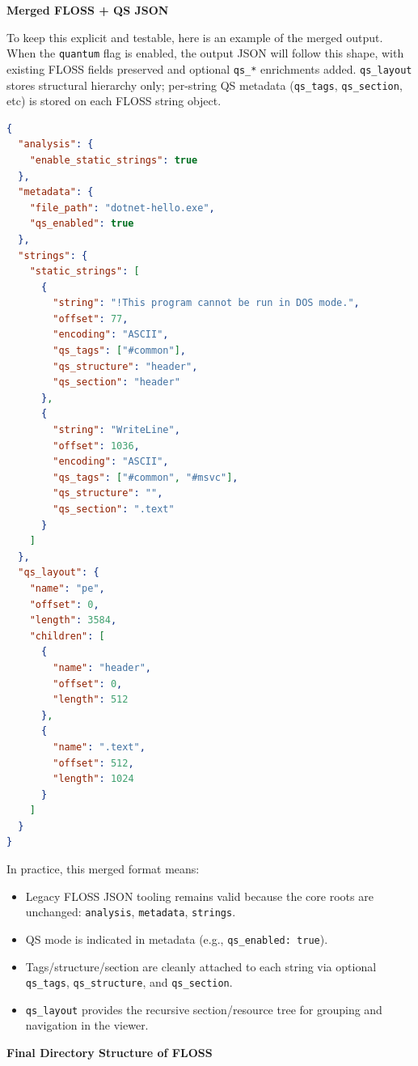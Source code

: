 \documentclass[12pt]{article}
\begin{document}
\textbf{Merged FLOSS + QS JSON}

To keep this explicit and testable, here is an example of the merged output. When the \texttt{quantum} flag is enabled, the output JSON will follow this shape, with existing FLOSS fields preserved and optional \texttt{qs\_*} enrichments added.
\texttt{qs\_layout} stores structural hierarchy only; per-string QS metadata (\texttt{qs\_tags}, \texttt{qs\_section}, etc) is stored on each FLOSS string object.

\begin{lstlisting}[language=json]
{
  "analysis": {
    "enable_static_strings": true
  },
  "metadata": {
    "file_path": "dotnet-hello.exe",
    "qs_enabled": true
  },
  "strings": {
    "static_strings": [
      {
        "string": "!This program cannot be run in DOS mode.",
        "offset": 77,
        "encoding": "ASCII",
        "qs_tags": ["#common"],
        "qs_structure": "header",
        "qs_section": "header"
      },
      {
        "string": "WriteLine",
        "offset": 1036,
        "encoding": "ASCII",
        "qs_tags": ["#common", "#msvc"],
        "qs_structure": "",
        "qs_section": ".text"
      }
    ]
  },
  "qs_layout": {
    "name": "pe",
    "offset": 0,
    "length": 3584,
    "children": [
      {
        "name": "header",
        "offset": 0,
        "length": 512
      },
      {
        "name": ".text",
        "offset": 512,
        "length": 1024
      }
    ]
  }
}
\end{lstlisting}

In practice, this merged format means:
\begin{itemize}
    \item Legacy FLOSS JSON tooling remains valid because the core roots are unchanged: \texttt{analysis}, \texttt{metadata}, \texttt{strings}.
    \item QS mode is indicated in metadata (e.g., \texttt{qs\_enabled: true}).
    \item Tags/structure/section are cleanly attached to each string via optional \texttt{qs\_tags}, \texttt{qs\_structure}, and \texttt{qs\_section}.
    \item \texttt{qs\_layout} provides the recursive section/resource tree for grouping and navigation in the viewer.
\end{itemize}

\textbf{Final Directory Structure of FLOSS}
\end{document}
